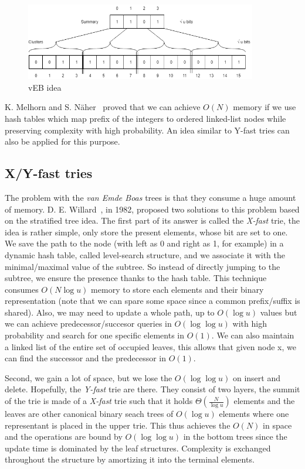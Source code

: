 \begin{figure}[!h]
   \caption{vEB idea}
   \label{vEB}
   \centering
   \includegraphics[width=0.9\textwidth]{vEB.png}
\end{figure}

K. Melhorn and S. Näher~\cite{mehlhorn1990bounded} proved that we can achieve $O(N)$ memory if we use hash tables which map prefix of the integers to ordered linked-list nodes while preserving complexity with high probability. An idea similar to Y-fast tries can also be applied for this purpose.

\subsection{X/Y-fast tries}

The problem with the \textit{van Emde Boas} trees is that they consume a huge amount of memory. D. E. Willard~\cite{willard1983log}, in 1982, proposed two solutions to this problem based on the stratified tree idea. The first part of its answer is called the \textit{X-fast} trie, the idea is rather simple, only store the present elements, whose bit are set to one. We save the path to the node (with left as 0 and right as 1, for example) in a dynamic hash table, called level-search structure, and we associate it with the minimal/maximal value of the subtree. So instead of directly jumping to the subtree, we ensure the presence thanks to the hash table. This technique consumes $O(N \log u)$ memory to store each elements and their binary representation (note that we can spare some space since a common prefix/suffix is shared). Also, we may need to update a whole path, up to $O(\log u)$ values but we can achieve predecessor/succesor queries in $O(\log \log u)$ with high probability and search for one specific elements in $O(1)$. We can also maintain a linked list of the entire set of occupied leaves, this allows that given node x, we can find the successor and the predecessor in $O(1)$.

Second, we gain a lot of space, but we lose the $O(\log \log u)$ on insert and delete. Hopefully, the \textit{Y-fast} trie are there. They consist of two layers, the summit of the trie is made of a \textit{X-fast} trie such that it holds $\Theta(\frac{N}{\log u})$ elements and the leaves are other canonical binary seach trees of $O(\log u)$ elements where one representant is placed in the upper trie. This thus achieves the $O(N)$ in space and the operations are bound by $O(\log \log u)$ in the bottom trees since the update time is dominated by the leaf structures. Complexity is exchanged throughout the structure by amortizing it into the terminal elements.

